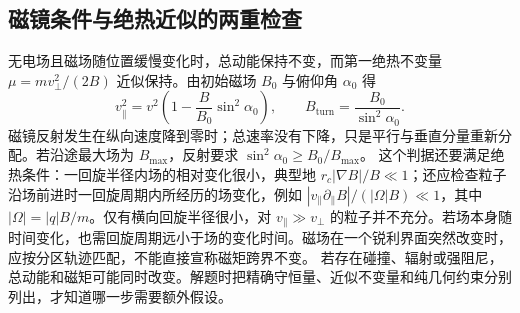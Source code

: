 \subsection{磁镜条件与绝热近似的两重检查}
无电场且磁场随位置缓慢变化时，总动能保持不变，而第一绝热不变量
$\mu=m v_\perp^2/(2B)$ 近似保持。由初始磁场 $B_0$ 与俯仰角 $\alpha_0$ 得
\[
 v_\parallel^2=v^2\left(1-\frac{B}{B_0}\sin^2\alpha_0\right),\qquad
 B_{\mathrm{turn}}=\frac{B_0}{\sin^2\alpha_0}.
\]
磁镜反射发生在纵向速度降到零时；总速率没有下降，只是平行与垂直分量重新分配。若沿途最大场为 $B_{\max}$，反射要求 $\sin^2\alpha_0\ge B_0/B_{\max}$。
这个判据还要满足绝热条件：一回旋半径内场的相对变化很小，典型地 $r_c|\nabla B|/B\ll1$；还应检查粒子沿场前进时一回旋周期内所经历的场变化，例如 $|v_\parallel\partial_\parallel B|/(|\Omega|B)\ll1$，其中 $|\Omega|=|q|B/m$。仅有横向回旋半径很小，对 $v_\parallel\gg v_\perp$ 的粒子并不充分。若场本身随时间变化，也需回旋周期远小于场的变化时间。磁场在一个锐利界面突然改变时，应按分区轨迹匹配，不能直接宣称磁矩跨界不变。
若存在碰撞、辐射或强阻尼，总动能和磁矩可能同时改变。解题时把精确守恒量、近似不变量和纯几何约束分别列出，才知道哪一步需要额外假设。

